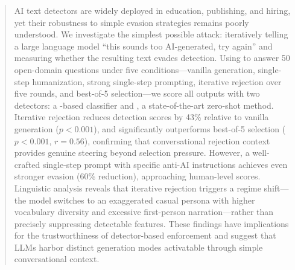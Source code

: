 \begin{abstract}
AI text detectors are widely deployed in education, publishing, and hiring, yet their robustness to simple evasion strategies remains poorly understood.
We investigate the simplest possible attack: iteratively telling a large language model ``this sounds too AI-generated, try again'' and measuring whether the resulting text evades detection.
Using \gptfour to answer 50 open-domain questions under five conditions---vanilla generation, single-step humanization, strong single-step prompting, iterative rejection over five rounds, and best-of-5 selection---we score all outputs with two detectors: a \roberta-based classifier and \binoculars, a state-of-the-art zero-shot method.
Iterative rejection reduces \binoculars detection scores by 43\% relative to vanilla generation ($p < 0.001$), and significantly outperforms best-of-5 selection ($p < 0.001$, $r = 0.56$), confirming that conversational rejection context provides genuine steering beyond selection pressure.
However, a well-crafted single-step prompt with specific anti-AI instructions achieves even stronger evasion (60\% reduction), approaching human-level scores.
Linguistic analysis reveals that iterative rejection triggers a regime shift---the model switches to an exaggerated casual persona with higher vocabulary diversity and excessive first-person narration---rather than precisely suppressing detectable features.
These findings have implications for the trustworthiness of detector-based enforcement and suggest that LLMs harbor distinct generation modes activatable through simple conversational context.
\end{abstract}
